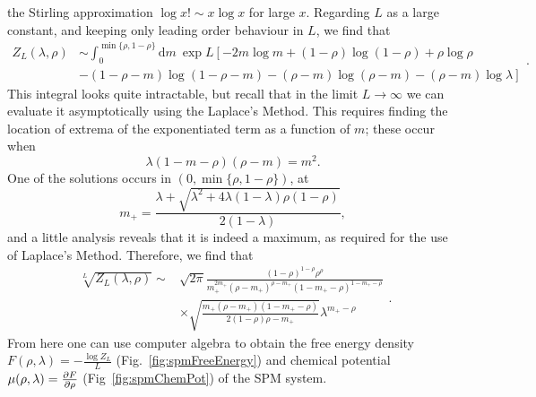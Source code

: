 the Stirling approximation $\log{x!} \sim x \log{x}$ for large $x$. Regarding $L$ as a large 
constant, and keeping only leading order behaviour in $L$, we find that 
\begin{equation}
\begin{split}
 Z_L (\lambda, \rho) &\sim \int_{0}^{\min{\{ \rho, 1-\rho \}}} \! \mathrm{d}m \
 \exp{L \left[-2m \log{m} + (1-\rho)\log{(1-\rho)} + \rho \log{\rho} \right.} \\
 & \left. -(1-\rho-m)\log{(1-\rho-m)}
 -(\rho-m)\log{(\rho-m)} - (\rho-m)\log \lambda \right]
 \end{split}.
\end{equation}
This integral looks quite intractable, but recall that in the limit $L \rightarrow \infty$ we can
evaluate it asymptotically using the Laplace's Method. This requires finding the location of
extrema of the exponentiated term as a function of $m$; these occur when
\begin{equation}
 \lambda(1-m-\rho)(\rho-m) = m^2 .
\end{equation}
One of the solutions occurs in $(0, \min{\{\rho, 1-\rho\}})$, at 
\begin{equation}
 m_+ = \frac{\lambda+\sqrt{\lambda^2 + 4\lambda(1-\lambda)\rho(1-\rho)}}{2(1-\lambda)},
\end{equation}
and a little analysis reveals that
it is indeed a maximum, as required for the use of Laplace's Method. Therefore, we find that
\begin{equation}
\begin{split}
\sqrt[L]{Z_L (\lambda, \rho)} \sim &\sqrt{2 \pi } \frac{  (1-\rho )^{1-\rho } \rho ^{\rho }}{
m_+^{2 m_+} \left(\rho -m_+\right)^{\rho-m_+} \left(1-m_+-\rho
   \right)^{1 - m_+ - \rho}}  \\ 
   & \times \sqrt{\frac{m_+
   \left(\rho -m_+\right) \left(1- m_+ -\rho\right)}{ 2 (1-\rho) \rho - m_+}} \lambda
   ^{m_+-\rho }
   \end{split}.
\end{equation}
From here one can use computer algebra to obtain the free energy density
$
 F(\rho, \lambda) = - \frac{\log{Z_L}}{L}
$
(Fig.~\ref{fig:spmFreeEnergy}) and chemical potential $\mu (\rho, \lambda) = \frac{\partial F}{\partial \rho}$
(Fig~\ref{fig:spmChemPot}) of the SPM system. 
